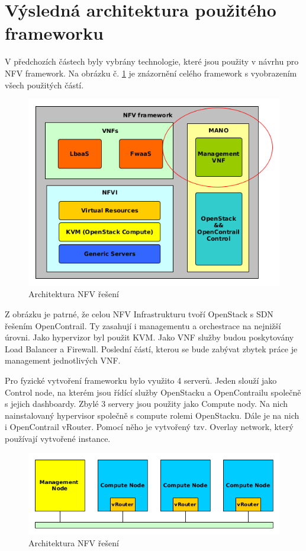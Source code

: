 \section{Výsledná architektura použitého frameworku}

V předchozích částech byly vybrány technologie, které jsou použity v návrhu pro NFV framework. Na obrázku č. \ref{fig:VNF_overview} je znázornění celého framework s vyobrazením všech použitých částí.

\begin{figure}[h]
\begin{centering}
\includegraphics[scale=0.61]{images/VNF_overview}
\par\end{centering}
\caption{Architektura NFV řešení\label{fig:VNF_overview}}
\end{figure}

Z obrázku je patrné, že celou NFV Infrastrukturu tvoří OpenStack s SDN řešením OpenContrail. Ty zasahují i managementu a orchestrace na nejnižší úrovni. Jako hypervizor byl použit KVM. Jako VNF služby budou poskytovány Load Balancer a Firewall. Poslední částí, kterou se bude zabývat zbytek práce je management jednotlivých VNF.

Pro fyzické vytvoření frameworku bylo využito 4 serverů. Jeden slouží jako Control node, na kterém jsou řídící služby OpenStacku a OpenContrailu společně s jejich dashboardy. Zbylé 3 servery jsou použity jako Compute nody. Na nich nainstalovaný hypervisor společně s compute rolemi OpenStacku. Dále je na nich i OpenContrail vRouter. Pomocí něho je vytvořený tzv. Overlay network, který používají vytvořené instance.


\begin{figure}[h]
\begin{centering}
\includegraphics[scale=0.61]{images/fyzicka_topologie}
\par\end{centering}
\caption{Architektura NFV řešení\label{fig:fyzicka_topologie}}
\end{figure}
